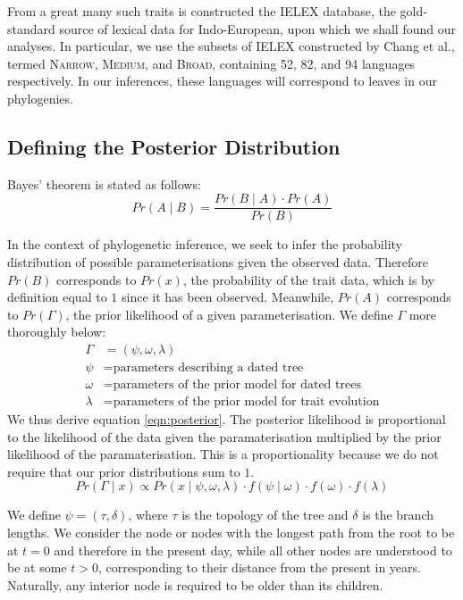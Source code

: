 \documentclass[10pt,journal,compsoc]{IEEEtran}
\begin{document}
From a great many such traits is constructed the IELEX database, the gold-standard source of lexical data for Indo-European, upon which we shall found our analyses. In particular, we use the subsets of IELEX constructed by Chang et al., termed \textsc{Narrow}, \textsc{Medium}, and \textsc{Broad}, containing 52, 82, and 94 languages respectively. In our inferences, these languages will correspond to leaves in our phylogenies.

\subsection{Defining the Posterior Distribution}

Bayes' theorem is stated as follows:
\begin{equation}
    Pr(A\;|\;B) = \frac{Pr(B\;|\;A) \cdot Pr(A)}{Pr(B)}
\end{equation}

In the context of phylogenetic inference, we seek to infer the probability distribution of possible parameterisations given the observed data. Therefore $Pr(B)$ corresponds to $Pr(x)$, the probability of the trait data, which is by definition equal to $1$ since it has been observed. Meanwhile, $Pr(A)$ corresponds to $Pr(\Gamma)$, the prior likelihood of a given parameterisation. We define $\Gamma$ more thoroughly below:
\begin{align*}
    \Gamma &= (\psi, \omega, \lambda)\\
    \psi   &= \text{parameters describing a dated tree}\\
    \omega &= \text{parameters of the prior model for dated trees}\\
    \lambda&= \text{parameters of the prior model for trait evolution}
\end{align*}
We thus derive equation \eqref{eqn:posterior}. The posterior likelihood is proportional to the likelihood of the data given the paramaterisation multiplied by the prior likelihood of the paramaterisation. This is a proportionality because we do not require that our prior distributions sum to $1$.
\begin{equation}\label{eqn:posterior}
    Pr(\Gamma\;|\; x) \propto Pr(x\;|\;\psi, \omega, \lambda) \cdot f(\psi\;|\;\omega) \cdot f(\omega) \cdot f(\lambda)
\end{equation}

We define $\psi = (\tau, \delta)$, where $\tau$ is the topology of the tree and $\delta$ is the branch lengths. We consider the node or nodes with the longest path from the root to be at $t = 0$ and therefore in the present day, while all other nodes are understood to be at some $t > 0$, corresponding to their distance from the present in years. Naturally, any interior node is required to be older than its children.
\end{document}
